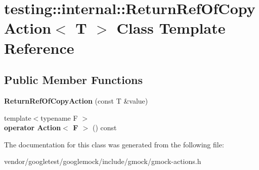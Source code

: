 \hypertarget{classtesting_1_1internal_1_1_return_ref_of_copy_action}{}\section{testing\+:\+:internal\+:\+:Return\+Ref\+Of\+Copy\+Action$<$ T $>$ Class Template Reference}
\label{classtesting_1_1internal_1_1_return_ref_of_copy_action}
\subsection*{Public Member Functions}
\begin{DoxyCompactItemize}
\item 
\mbox{\label{classtesting_1_1internal_1_1_return_ref_of_copy_action_a073c18a8b50423b08f6603e860622839}} 
{\bfseries Return\+Ref\+Of\+Copy\+Action} (const T \&value)
\item 
\mbox{\label{classtesting_1_1internal_1_1_return_ref_of_copy_action_a8b4829fbb46c3ca6468f3eb5c5b42493}} 
{\footnotesize template$<$typename F $>$ }\\{\bfseries operator Action$<$ F $>$} () const
\end{DoxyCompactItemize}


The documentation for this class was generated from the following file\+:\begin{DoxyCompactItemize}
\item 
vendor/googletest/googlemock/include/gmock/gmock-\/actions.\+h\end{DoxyCompactItemize}
